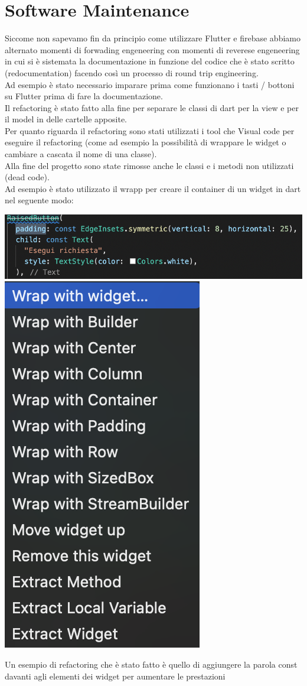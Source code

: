 \documentclass{article}
\begin{document}
\section{Software Maintenance}
Siccome non sapevamo fin da principio come utilizzare Flutter e firebase abbiamo alternato momenti di forwading engeneering con momenti di reverese
engeneering in cui si è sistemata la documentazione in funzione del codice che è stato scritto (redocumentation) facendo così un processo
di round trip engineering.
\\Ad esempio è stato necessario imparare prima come funzionano i tasti / bottoni su Flutter prima di fare la documentazione.
\\Il refactoring è stato fatto alla fine per separare le classi di dart per la view e per il model in delle cartelle apposite.
\\Per quanto riguarda il refactoring sono stati utilizzati i tool che Visual code per eseguire il refactoring (come ad esempio 
la possibilità di wrappare le widget o cambiare a cascata il nome di una classe).
\\Alla fine del progetto sono state rimosse anche le classi e i metodi non utilizzati (dead code).
\\Ad esempio è stato utilizzato il wrapp per creare il container di un widget in dart nel seguente modo:

\includegraphics[scale = 0.25]{"Immagini/ref1.PNG"}
\\\includegraphics[scale = 0.25]{"Immagini/ref2.PNG"}

Un esempio di refactoring che è stato fatto è quello di aggiungere la parola const davanti agli elementi dei widget per aumentare le prestazioni
\end{document}
